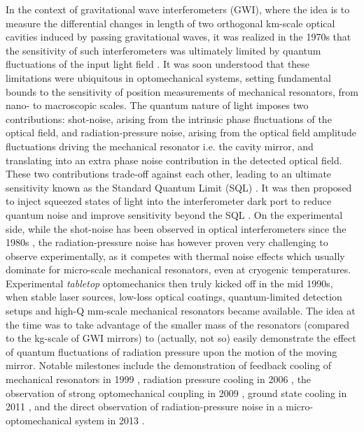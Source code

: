 In the context of gravitational wave interferometers (GWI), where the idea is to measure the differential changes in length of two orthogonal km-scale optical cavities induced by passing gravitational waves, it was realized in the 1970s that the sensitivity of such interferometers was ultimately limited by quantum fluctuations of the input light field \cite{Braginsky1968JETP_ClassicalQuantumRestrictions,Caves1980PRL_RadiationPressureFluctuations}. It was soon understood that these limitations were ubiquitous in optomechanical systems, setting fundamental bounds to the sensitivity of position measurements of mechanical resonators, from nano- to macroscopic scales. The quantum nature of light imposes two contributions: shot-noise, arising from the intrinsic phase fluctuations of the optical field, and radiation-pressure noise, arising from the optical field amplitude fluctuations driving the mechanical resonator i.e. the cavity mirror, and translating into an extra phase noise contribution in the detected optical field. These two contributions trade-off against each other, leading to an ultimate sensitivity known as the Standard Quantum Limit (SQL) \cite{BraginskyVorontsovThorne1980Science_QND,BraginskyKhalili1992Book_QuantumMeasurement, clerk_introduction_2010}. It was then proposed to inject squeezed states of light into the interferometer dark port to reduce quantum noise and improve sensitivity beyond the SQL \cite{caves1981}. On the experimental side, while the shot-noise has been observed in optical interferometers since the 1980s \cite{Loudon1983QuantumTheoryOfLight}, the radiation-pressure noise has however proven very challenging to observe experimentally, as it competes with thermal noise effects which usually dominate for micro-scale mechanical resonators, even at cryogenic temperatures. \\ 

Experimental \textit{tabletop} optomechanics then truly kicked off in the mid 1990s, when stable laser sources, low-loss optical coatings, quantum-limited detection setups and high-Q mm-scale mechanical resonators became available. The idea at the time was to take advantage of the smaller mass of the resonators (compared to the kg-scale of GWI mirrors) to (actually, not so) easily demonstrate the effect of quantum fluctuations of radiation pressure upon the motion of the moving mirror. Notable milestones include the demonstration of feedback cooling of mechanical resonators in 1999 \cite{cohadon_cooling_1999}, radiation pressure cooling in 2006 \cite{arcizet2006,Gigan2006}, the observation of strong optomechanical coupling in 2009 \cite{groblacher2009}, ground state cooling in 2011 \cite{Teufel2011}, and the direct observation of radiation-pressure noise in a micro-optomechanical system in 2013 \cite{regal2013}. \\ 




